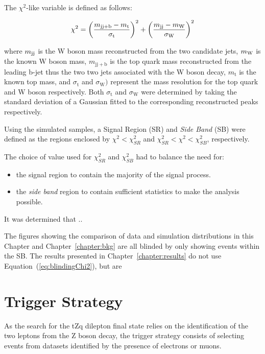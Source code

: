 The $\chi^{2}$-like variable is defined as follows:

\begin{equation}\label{eq:blindingChi2}
   \chi^{2} = {\left(\frac{m_{\mathrm{jj+b}}-m_{\mathrm{t}}}{\sigma_{\mathrm{t}}}\right)}^{2} + {\left(\frac{m_{\rm jj}-m_{\rm W}}{\sigma_{\mathrm{W}}}\right)}^{2}
\end{equation}

where $m_{\rm jj}$ is the W boson mass reconstructed from the two candidate jets, $m_{\rm W}$ is the known W boson mass, $m_{\mathrm{jj+b}}$ is the top quark mass reconstructed from the leading b-jet thus the two two jets associated with the W boson decay, $m_{\mathrm{t}}$ is the known top mass, and $\sigma_{\mathrm{t}}$ and $\sigma_{\mathrm{W}})$ represent the mass resolution for the top quark and W boson respectively.
Both $\sigma_{\mathrm{t}}$ and $\sigma_{\mathrm{W}}$ were determined by taking the standard deviation of a Gaussian fitted to the corresponding reconstructed peaks respectively.

Using the simulated samples, a Signal Region (SR) and \emph{Side Band} (SB) were defined as the regions enclosed by $\chi^{2} < \chi^{2}_{SR}$ and $\chi^{2}_{SR} < \chi^{2} < \chi^{2}_{SB}$, respectively.

The choice of value used for $\chi^{2}_{SR}$ and $\chi^{2}_{SB}$ had to balance the need for:
\begin{itemize}
\item the signal region to contain the majority of the signal process.
\item the \emph{side band} region to contain sufficient statistics to make the analysis possible.
\end{itemize}

It was determined that ..

The figures showing the comparison of data and simulation distributions in this Chapter and Chapter~\ref{chapter:bkg}  are all blinded by only showing events within the SB.
The results presented in Chapter~\ref{chapter:results} do not use Equation~(\ref{eq:blindingChi2}), but are 

\section{Trigger Strategy}\label{sec:triggerStrategy}
As the search for the tZq dilepton final state relies on the identification of the two leptons from the Z boson decay, the trigger strategy consists of selecting events from datasets identified by the presence of electrons or muons.

